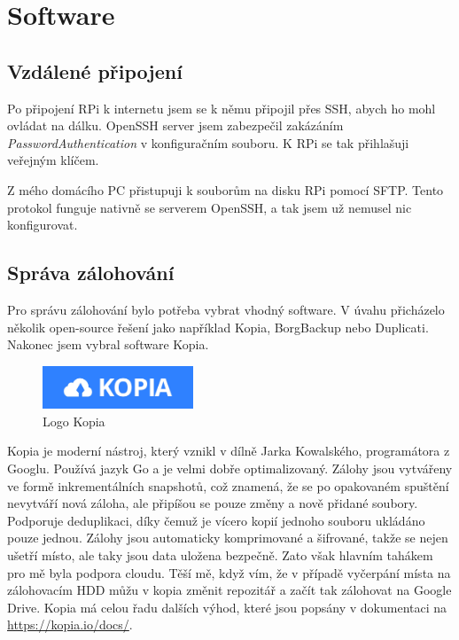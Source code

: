 \documentclass[a4paper,12pt, oneside]{book}
\begin{document}


\chapter{Software}

\section{Vzdálené připojení}

Po připojení RPi k internetu jsem se k němu připojil přes SSH, 
abych ho mohl ovládat na dálku. OpenSSH server jsem zabezpečil zakázáním
\emph{PasswordAuthentication} v konfiguračním souboru. K RPi se tak přihlašuji  
veřejným klíčem. 

Z mého domácího PC přistupuji k souborům na disku RPi pomocí SFTP.
Tento protokol funguje nativně se serverem OpenSSH, a tak jsem už nemusel
nic konfigurovat.

\section{Správa zálohování}
Pro správu zálohování bylo potřeba vybrat vhodný software. 
V úvahu přicházelo několik open-source řešení jako například 
Kopia, BorgBackup nebo Duplicati. Nakonec jsem vybral software 
Kopia. 

\begin{figure}
	\centering
	\includegraphics[width=0.4\textwidth]{img/kopia.jpg}
	\caption{Logo Kopia}
\end{figure}

Kopia je moderní nástroj, který vznikl v dílně Jarka Kowalského, 
programátora z Googlu. Používá jazyk Go a je velmi dobře optimalizovaný.
\cite{Kopia-GitHub}
Zálohy jsou vytvářeny ve formě inkrementálních snapshotů,
což znamená, že se po opakovaném spuštění nevytváří nová záloha, ale 
připíšou se pouze změny a nově přidané soubory. Podporuje deduplikaci,
díky čemuž je vícero kopií jednoho souboru ukládáno pouze jednou. 
Zálohy jsou automaticky komprimované a šifrované, takže se nejen ušetří 
místo, ale taky jsou data uložena bezpečně. \cite{Kopia-Docs} Zato však hlavním
tahákem pro mě byla podpora cloudu. Těší mě, když vím, že v případě vyčerpání
místa na 
zálohovacím HDD můžu v kopia změnit repozitář a začít tak zálohovat na 
Google Drive.
Kopia má celou řadu dalších výhod,
které jsou popsány v dokumentaci na \url{https://kopia.io/docs/}.
\end{document}
